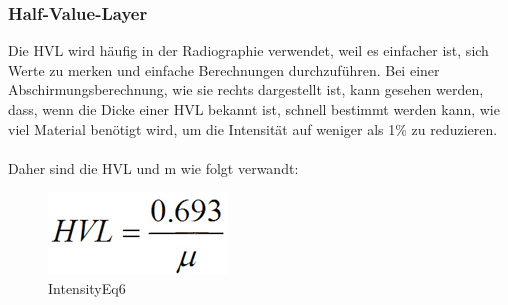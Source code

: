   \subsubsection{Half-Value-Layer}
Die HVL wird häufig in der Radiographie verwendet, weil es einfacher ist, sich Werte zu merken und einfache Berechnungen durchzuführen. Bei einer Abschirmungsberechnung, wie sie rechts dargestellt ist, kann gesehen werden, dass, wenn die Dicke einer HVL bekannt ist, schnell bestimmt werden kann, wie viel Material benötigt wird, um die Intensität auf weniger als 1\% zu reduzieren.\\
\\
Daher sind die HVL und m wie folgt verwandt:
\begin{figure}[htb]
\centering 
  \includegraphics[scale=0.5]{img/IntensityEq6.jpg}
  \caption{IntensityEq6}
  \label{fig:IntensityEq6}
  
  \end{figure}
